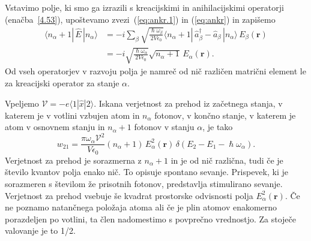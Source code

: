 Vstavimo polje, ki smo ga izrazili s kreacijskimi in anihilacijskimi operatorji (enačba~\ref{4.53}),
upoštevamo zvezi~(\ref{eq:ankr.1}) in (\ref{eq:ankr}) in zapišemo
\begin{align}
\langle n_{\alpha}+1|\, \hat{E}\,|n_{\alpha}\rangle & = 
 -i\sum_{\beta}\sqrt{\frac{\hslash\omega_{\beta}}{2V\epsilon_{0}}}
\langle n_{\alpha}+1|\,\hat{a}_{\beta}^{\dagger}-\hat{a}_{\beta}\,|n_{\alpha}\rangle\, 
E_{\beta}(\mathbf{r})\nonumber \\
 & =  -i\sqrt{\frac{\hslash\omega_{\alpha}}{2V\epsilon_{0}}}
 \sqrt{n_{\alpha}+1}\, E_{\alpha}(\mathbf{r}).
\end{align}
Od vseh operatorjev v razvoju polja je namreč od nič različen matrični
element le za kreacijski operator za stanje $\alpha$.

Vpeljemo $\mathcal{V} = -e \langle1|\hat{x}|2\rangle$.
 Iskana verjetnost za prehod iz 
začetnega stanja, v katerem je v votlini vzbujen atom in $n_{\alpha}$ fotonov, v končno
stanje, v katerem je atom v osnovnem stanju in $n_{\alpha}+1$ fotonov v stanju $\alpha$, je tako
\begin{equation}
w_{21}=\frac{\pi \omega_{\alpha}\mathcal{V}^{2}}{V\epsilon_{0}}
(n_{\alpha}+1)\,E_{\alpha}^{2}(\mathbf{r})\,\delta(E_{2}-E_{1}-\hslash\omega_{\alpha}).
\label{4.56}
\end{equation}
Verjetnost za prehod je sorazmerna z $n_{\alpha}+1$ in je od nič
različna, tudi če je število kvantov polja enako nič. To opisuje 
spontano sevanje. Prispevek, ki je 
sorazmeren s številom že prisotnih fotonov, predstavlja stimulirano 
sevanje. Verjetnost za prehod vsebuje
še kvadrat prostorske odvisnosti polja $E_{\alpha}^{2}(\mathbf{r})$.
Če ne poznamo natančnega položaja atoma ali če je plin atomov enakomerno
porazdeljen po votlini, ta člen nadomestimo s povprečno vrednostjo.
Za stoječe valovanje je to 1/2.

